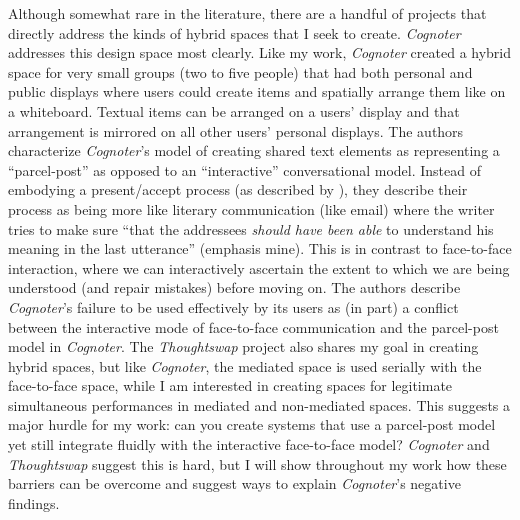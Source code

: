 Although somewhat rare in the literature, there are a handful of projects that directly address the kinds of hybrid spaces that I seek to create. \emph{Cognoter} \citep{Tatar:1991jq} addresses this design space most clearly. Like my work, \emph{Cognoter} created a hybrid space for very small groups (two to five people) that had both personal and public displays where users could create items and spatially arrange them like on a whiteboard. Textual items can be arranged on a users' display and that arrangement is mirrored on all other users' personal displays. The authors characterize \emph{Cognoter}'s model of creating shared text elements as representing a ``parcel-post'' as opposed to an ``interactive'' conversational model. Instead of embodying a present/accept process (as described by \citep{Clark:1989uc}), they describe their process as being more like literary communication (like email) where the writer tries to make sure ``that the addressees \emph{should have been able} to understand his meaning in the last utterance'' (emphasis mine). This is in contrast to face-to-face interaction, where we can interactively ascertain the extent to which we are being understood (and repair mistakes) before moving on. The authors describe \emph{Cognoter}'s failure to be used effectively by its users as (in part) a conflict between the interactive mode of face-to-face communication and the parcel-post model in \emph{Cognoter}. The \emph{Thoughtswap} project \citep{DickeyKurdziolek:2010wt} also shares my goal in creating hybrid spaces, but like \emph{Cognoter}, the mediated space is used serially with the face-to-face space, while I am interested in creating spaces for legitimate simultaneous performances in mediated and non-mediated spaces. This suggests a major hurdle for my work: can you create systems that use a parcel-post model yet still integrate fluidly with the interactive face-to-face model? \emph{Cognoter} and \emph{Thoughtswap} suggest this is hard, but I will show throughout my work how these barriers can be overcome and suggest ways to explain \emph{Cognoter}'s negative findings.




